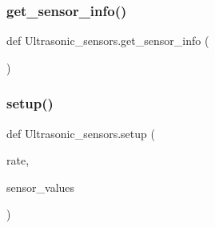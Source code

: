 \subsubsection{\texorpdfstring{get\+\_\+sensor\+\_\+info()}{get\_sensor\_info()}}
{\footnotesize\ttfamily def Ultrasonic\+\_\+sensors.\+get\+\_\+sensor\+\_\+info (\begin{DoxyParamCaption}{ }\end{DoxyParamCaption})}

\mbox{\label{namespace_ultrasonic__sensors_a57e901bee678edc609c318cdb0cc0bc3}} 
\subsubsection{\texorpdfstring{setup()}{setup()}}
{\footnotesize\ttfamily def Ultrasonic\+\_\+sensors.\+setup (\begin{DoxyParamCaption}\item[{}]{rate,  }\item[{}]{sensor\+\_\+values }\end{DoxyParamCaption})}

